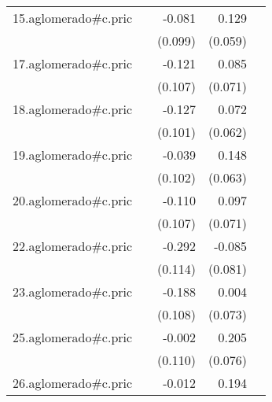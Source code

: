 {\begin{longtable}{l*{4}{D{.}{.}{-1}}}
\addlinespace
15.aglomerado#c.pric&                     &      -0.081         &       0.129\sym{*}  &                     \\
            &                     &     (0.099)         &     (0.059)         &                     \\
\addlinespace
17.aglomerado#c.pric&                     &      -0.121         &       0.085         &                     \\
            &                     &     (0.107)         &     (0.071)         &                     \\
\addlinespace
18.aglomerado#c.pric&                     &      -0.127         &       0.072         &                     \\
            &                     &     (0.101)         &     (0.062)         &                     \\
\addlinespace
19.aglomerado#c.pric&                     &      -0.039         &       0.148\sym{*}  &                     \\
            &                     &     (0.102)         &     (0.063)         &                     \\
\addlinespace
20.aglomerado#c.pric&                     &      -0.110         &       0.097         &                     \\
            &                     &     (0.107)         &     (0.071)         &                     \\
\addlinespace
22.aglomerado#c.pric&                     &      -0.292\sym{*}  &      -0.085         &                     \\
            &                     &     (0.114)         &     (0.081)         &                     \\
\addlinespace
23.aglomerado#c.pric&                     &      -0.188         &       0.004         &                     \\
            &                     &     (0.108)         &     (0.073)         &                     \\
\addlinespace
25.aglomerado#c.pric&                     &      -0.002         &       0.205\sym{**} &                     \\
            &                     &     (0.110)         &     (0.076)         &                     \\
\addlinespace
26.aglomerado#c.pric&                     &      -0.012         &       0.194\sym{**} &                     \\

\end{longtable}}
